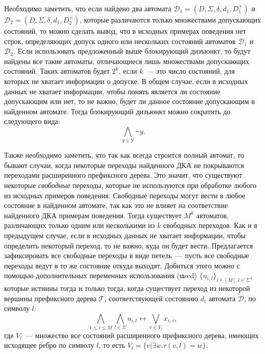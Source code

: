 
Необходимо заметить, что если найдено два автомата $\mathcal{D}_1 = \left(D,\Sigma,\delta,d_{1},D_{1}^{+}\right)$ и $\mathcal{D}_2 = \left(D,\Sigma,\delta,d_{1},D_{2}^{+}\right)$, которые различаются только множествами допускающих состояний, то можно сделать вывод, что в исходных примерах поведения нет строк, определяющих допуск одного или нескольких состояний автоматов $\mathcal{D}_{1}$ и $\mathcal{D}_{2}$.
Если использовать предложенный выше блокирующий дизъюнкт, то будут найдены все такие автоматы, отличающиеся лишь множествами допускающих состояний.
Таких автоматов будет $2^{k}$, если $k$~{---} это число состояний, для которых не хватает информации о допуске.
В общем случае, если в исходных данных не хватает информации, чтобы понять является ли состояние допускающим или нет, то не важно, будет ли данное состояние допускающим в найденном автомате.
Тогда блокирующий дизъюнкт можно сократить до следующего вида: $$\bigwedge_{y \in \mathcal{Y}} \neg y.$$

Также необходимо заметить, что так как всегда строится полный автомат, то бывают случаи, когда некоторые переходы найденного ДКА не покрываются переходами расширенного префиксного дерева.
Это значит, что существуют некоторые \emph{свободные} переходы, которые не используются при обработке любого из исходных примеров поведения.
Свободные переходы могут вести в любое состояние в найденном автомате, так как это не влияет на соответствие найденного ДКА примерам поведения.
Тогда существует $M^{k}$ автоматов, различающих только одним или несколькими из $k$ свободных переходов.
Как и в предыдущем случае, если в исходных данных не хватает информации, чтобы определить некоторый переход, то не важно, куда он будет вести.
Предлагается зафиксировать все свободные переходы в виде петель~{---} пусть все свободные переходы ведут в то же состояние откуда выходят.
Добиться этого можно с помощью дополнительных переменных использования (\textbf{u}sed) $\{u_{i,l}\}_{i \in \left[M\right],l \in \Sigma}$, которые истинны тогда и только тогда, когда существует переход из некоторой вершины префиксного дерева $\mathcal{T}$, соответствующей состоянию $d_{i}$ автомата $\mathcal{D}$, по символу $l$: $$\bigwedge_{1 \leq i \leq M} \bigwedge_{l \in \Sigma} u_{i,l} \leftrightarrow \bigvee_{v \in V_{l}}x_{v,i},$$
где $V_{l}$~{---} множество все состояний расширенного префиксного дерева, имеющих исходящее ребро по символу $l$, то есть $V_{l} = \{v | \exists w.\tau\left(v,l\right) = w\}$.

